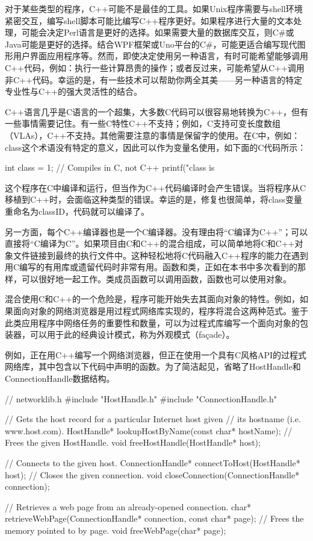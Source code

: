 
对于某些类型的程序，C++可能不是最佳的工具。如果Unix程序需要与shell环境紧密交互，编写shell脚本可能比编写C++程序更好。如果程序进行大量的文本处理，可能会决定Perl语言是更好的选择。如果需要大量的数据库交互，则C\#或Java可能是更好的选择。结合WPF框架或Uno平台的C\#，可能更适合编写现代图形用户界面应用程序等。然而，即使决定使用另一种语言，有时可能希望能够调用C++代码，例如：执行一些计算昂贵的操作；或者反过来，可能希望从C++调用非C++代码。幸运的是，有一些技术可以帮助你两全其美——另一种语言的特定专业性与C++的强大灵活性的结合。


C++语言几乎是C语言的一个超集，大多数C代码可以很容易地转换为C++，但有一些事情需要记住。有一些C特性C++不支持；例如，C支持可变长度数组（VLAs），C++不支持。其他需要注意的事情是保留字的使用。在C中，例如：class这个术语没有特定的意义，因此可以作为变量名使用，如下面的C代码所示：

\begin{cpp}
int class = 1; // Compiles in C, not C++
printf("class is %
\end{cpp}

这个程序在C中编译和运行，但当作为C++代码编译时会产生错误。当将程序从C移植到C++时，会面临这种类型的错误。幸运的是，修复也很简单，将class变量重命名为classID，代码就可以编译了。

另一方面，每个C++编译器也是一个C编译器。没有理由将“C编译为C++”；可以直接将“C编译为C”。如果项目由C和C++的混合组成，可以简单地将C和C++对象文件链接到最终的执行文件中。这种轻松地将C代码融入C++程序的能力在遇到用C编写的有用库或遗留代码时非常有用。函数和类，正如在本书中多次看到的那样，可以很好地一起工作。类成员函数可以调用函数，函数也可以使用对象。


混合使用C和C++的一个危险是，程序可能开始失去其面向对象的特性。例如，如果面向对象的网络浏览器是用过程式网络库实现的，程序将混合这两种范式。鉴于此类应用程序中网络任务的重要性和数量，可以为过程式库编写一个面向对象的包装器，可以用于此的经典设计模式，称为外观模式（façade）。

例如，正在用C++编写一个网络浏览器，但正在使用一个具有C风格API的过程式网络库，其中包含以下代码中声明的函数。为了简洁起见，省略了HostHandle和ConnectionHandle数据结构。

\begin{cpp}
// networklib.h
#include "HostHandle.h"
#include "ConnectionHandle.h"

// Gets the host record for a particular Internet host given
// its hostname (i.e. www.host.com).
HostHandle* lookupHostByName(const char* hostName);
// Frees the given HostHandle.
void freeHostHandle(HostHandle* host);

// Connects to the given host.
ConnectionHandle* connectToHost(HostHandle* host);
// Closes the given connection.
void closeConnection(ConnectionHandle* connection);

// Retrieves a web page from an already-opened connection.
char* retrieveWebPage(ConnectionHandle* connection, const char* page);
// Frees the memory pointed to by page.
void freeWebPage(char* page);
\end{cpp}

